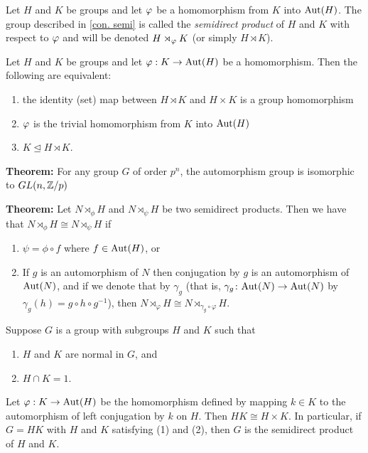 \begin{defn}
Let $H$ and $K$ be groups and let $\varphi$ be a homomorphism from $K$ into $\text{Aut}(H)$. The group described in \autoref{con. semi} is called the \textit{semidirect product} of $H$ and $K$ with respect to $\varphi$ and will be denoted $H\rtimes_\varphi K$ (or simply $H\rtimes K$).
\end{defn}

\nl

\begin{prop}
Let $H$ and $K$ be groups and let $\varphi:K\rightarrow \text{Aut}(H)$ be a homomorphism. Then the following are equivalent:
\begin{enumerate}
\item the identity (set) map between $H\rtimes K$ and $H\times K$ is a group homomorphism
\item $\varphi$ is the trivial homomorphism from $K$ into $\text{Aut}(H)$
\item $K\unlhd H\rtimes K$.
\end{enumerate}
\end{prop}

\nl

\textbf{Theorem:} For any group $G$ of order $p^n$, the automorphism group is isomorphic to $GL(n, \mathbb{Z}/p)$

\nl

\textbf{Theorem:} Let $N\rtimes_\phi H$ and $N\rtimes_\psi H$ be two semidirect products. Then we have that $N\rtimes_\phi H\cong N\rtimes_\psi H$ if
\begin{enumerate}
    \item $\psi = \phi \circ f$ where $f\in \text{Aut}(H)$, or
    \item  If $g$ is an automorphism of $N$ then conjugation by $g$ is an automorphism of ${\rm Aut}(N)$, and if we denote that by $\gamma_g$ (that is, $\gamma_g \colon {\rm Aut}(N) \rightarrow {\rm Aut}(N)$ by $\gamma_g(h) = g \circ h \circ g^{-1}$), then $N \rtimes_{\varphi} H \cong N \rtimes_{\gamma_g \circ \varphi} H$. 
\end{enumerate}


\nl

\begin{thm}
Suppose $G$ is a group with subgroups $H$ and $K$ such that
\begin{enumerate}
\item $H$ and $K$ are normal in $G$, and
\item $H\cap K = 1$.
\end{enumerate}
Let $\varphi:K\rightarrow \text{Aut}(H)$ be the homomorphism defined by mapping $k\in K$ to the automorphism of left conjugation by $k$ on $H$. Then $HK\cong H\times K$. In particular, if $G=HK$ with $H$ and $K$ satisfying (1) and (2), then $G$ is the semidirect product of $H$ and $K$.
\end{thm}

